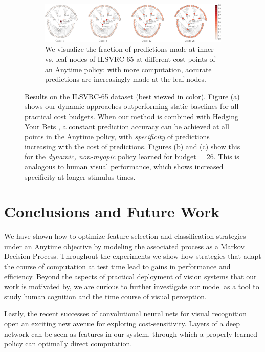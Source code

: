 \begin{figure}[ht]
\begin{subfigure}[b]{0.43\textwidth}
{            \label{fig:imagenet-b}
            }
    \end{subfigure}\\\vspace{1em}
    \begin{subfigure}[b]{.97\textwidth}
            \includegraphics[width=\textwidth]{../../figures/apr11_assembly/ilsvrc65_network-crop.pdf}
            \caption{
            We visualize the fraction of predictions made at inner vs. leaf nodes of ILSVRC-65 at different cost points of an Anytime policy: with more computation, accurate predictions are increasingly made at the leaf nodes.
            \label{fig:imagenet-c}
            }
    \end{subfigure}

\caption{
Results on the ILSVRC-65 dataset (best viewed in color).
Figure (a) shows our dynamic approaches outperforming static baselines for all practical cost budgets.
When our method is combined with Hedging Your Bets \parencite{Deng-CVPR-2012}, a constant prediction accuracy can be achieved at all points in the Anytime policy, with \emph{specificity} of predictions increasing with the cost of predictions.
Figures (b) and (c) show this for the \emph{dynamic, non-myopic} policy learned for budget = 26.
This is analogous to human visual performance, which shows increased specificity at longer stimulus times.
\label{fig:imagenet}}
\end{figure}

\section{Conclusions and Future Work}
We have shown how to optimize feature selection and classification strategies under an Anytime objective by modeling the associated process as a Markov Decision Process.
Throughout the experiments we show how strategies that adapt the course of computation at test time lead to gains in performance and efficiency.
Beyond the aspects of practical deployment of vision systems that our work is motivated by, we are curious to further investigate our model as a tool to study human cognition and the time course of visual perception.

Lastly, the recent successes of convolutional neural nets for visual recognition open an exciting new avenue for exploring cost-sensitivity.
Layers of a deep network can be seen as features in our system, through which a properly learned policy can optimally direct computation.
